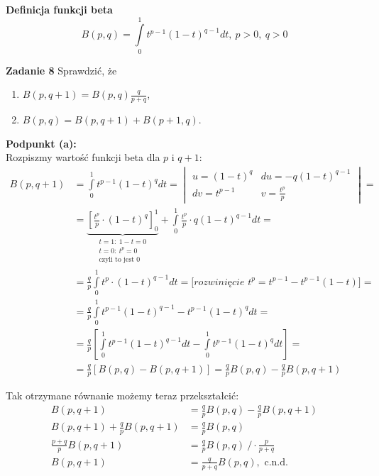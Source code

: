 \documentclass[a4paper,12pt]{article}
\begin{document}
\newpage
\noindent \textbf{Definicja funkcji beta} \newline
\[
    B(p, q) = \int\limits_0^1 t^{p-1} (1-t)^{q-1} dt, \ p > 0, \ q > 0  
\]

\noindent \newline \textbf{Zadanie 8} \newline
Sprawdzić, że
\begin{enumerate}[label=(\alph*)]
    \item $B(p, q+1) = B(p, q) \frac{q}{p+q}$,
    \item $B(p, q) = B(p, q+1) + B(p+1, q)$.
\end{enumerate}

\noindent \textbf{Podpunkt (a):} \\
Rozpiszmy wartość funkcji beta dla $p$ i $q+1$:
\begin{align*}
    B(p, q+1) &= \int\limits_0^1 t^{p-1} (1-t)^{q} dt =
        \begin{vmatrix}
            u  = (1-t)^q    & du = -q (1-t)^{q-1} \\    
            dv = t^{p-1}    & v  = \frac{t^p}{p}    
        \end{vmatrix} = \\ 
    &= \underbrace{\left[ \frac{t^p}{p} \cdot (1-t)^q \right]_0^1}_{
        \substack{t = 1: \ 1 - t = 0 \\ t = 0: \ t^p = 0 \\ \text{czyli to jest }0}}
        + \int\limits_0^1 \frac{t^p}{p} \cdot q(1-t)^{q-1} dt = \\
    &= \frac{q}{p} \int\limits_0^1 t^p \cdot (1-t)^{q-1} dt = 
        \Big[
            \textit{rozwinięcie } t^p = t^{p-1} - t^{p-1} (1-t)
        \Big] = \\ 
    &= \frac{q}{p} \int\limits_0^1 t^{p-1} (1-t)^{q-1} - t^{p-1} (1-t)^q dt = \\
    &= \frac{q}{p} \left[
            \int\limits_0^1 t^{p-1} (1-t)^{q-1} dt
            - \int\limits_0^1 t^{p-1} (1-t)^q dt
        \right] = \\
    &= \frac{q}{p} \left[ B(p, q) - B(p, q + 1) \right] = 
    \frac{q}{p} B(p, q) - \frac{q}{p} B(p, q + 1)
\end{align*}

\noindent Tak otrzymane równanie możemy teraz przekształcić:
\begin{align*}
    B(p, q+1) &= \frac{q}{p} B(p, q) - \frac{q}{p} B(p, q + 1) \\
    B(p, q+1) + \frac{q}{p} B(p, q + 1) &= \frac{q}{p} B(p, q) \\
    \frac{p + q}{p} B(p, q + 1) &= \frac{q}{p} B(p, q) \ / \cdot \frac{p}{p + q} \\
    B(p, q + 1) &= \frac{q}{p + q} B(p, q), \text{ c.n.d.}
\end{align*}\\
\end{document}
